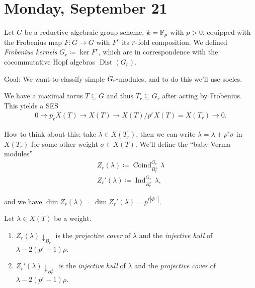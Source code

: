 \hypertarget{monday-september-21}{%
\section{Monday, September 21}\label{monday-september-21}}

Let \(G\) be a reductive algebraic group scheme,
\(k=\mkern 1.5mu\overline{\mkern-1.5mu{\mathbb{F}}\mkern-1.5mu}\mkern 1.5mu_p\)
with \(p>0\), equipped with the Frobenius map \(F:G\to G\) with \(F^r\)
its \(r{\hbox{-}}\)fold composition. We defined \emph{Frobenius kernels}
\(G_r \coloneqq\ker F^r\), which are in correspondence with the
cocommutative Hopf algebras \(\operatorname{Dist}(G_r)\).

Goal: We want to classify simple \(G_r{\hbox{-}}\)modules, and to do
this we'll use socles.

We have a maximal torus \(T\subseteq G\) and thus \(T_r \subseteq G_r\)
after acting by Frobenius. This yields a SES
\begin{align*}  
0 \to p_r X(T) \to X(T) \to X(T)/p^r X(T) = X(T_r) \to 0
.\end{align*}

How to think about this: take \(\lambda \in X(T_r)\), then we can write
\(\lambda = \lambda + p^r \sigma\) in \(X(T_r)\) for some other weight
\(\sigma \in X(T)\). We'll define the ``baby Verma modules''
\begin{align*}  
Z_r(\lambda) \coloneqq\operatorname{Coind}_{B_r^+}^{G_r} \lambda \\
Z_r'(\lambda) \coloneqq\operatorname{Ind}_{B_r^+}^{G_r} \lambda
,\end{align*}

and we have
\(\dim Z_r(\lambda) = \dim Z_r'(\lambda) = p^{r {\left\lvert {\Phi^+} \right\rvert}}\).

\begin{proposition}[?]

Let \(\lambda\in X(T)\) be a weight.

\begin{enumerate}
\def\labelenumi{\arabic{enumi}.}
\item
  \(Z_r(\lambda)\downarrow_{B_r}\) is the \emph{projective cover} of
  \(\lambda\) and the \emph{injective hull} of
  \(\lambda - 2 (p^r-1) \rho\).
\item
  \(Z_r'(\lambda)\downarrow_{B_r^+}\) is the \emph{injective hull} of
  \(\lambda\) and the \emph{projective cover} of
  \(\lambda - 2 (p^r-1) \rho\).
\end{enumerate}

\end{proposition}

